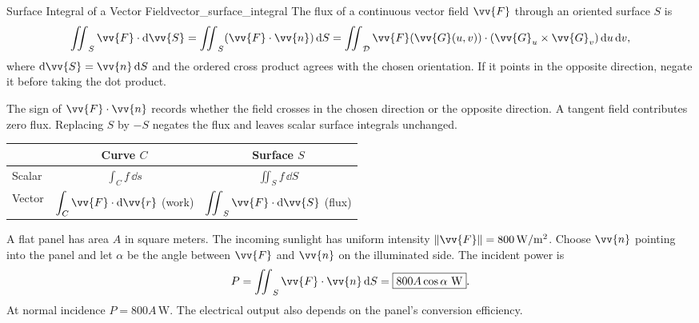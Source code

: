 \begin{theorem}{Surface Integral of a Vector Field}{vector_surface_integral}
The flux of a continuous vector field $\vv{F}$ through an oriented surface $S$ is
\[
    \iint_S \vv{F}\cdot\dd{\vv{S}}
    = \iint_S (\vv{F}\cdot\vv{n})\,\dd{S}
    = \iint_{\mathcal{D}}
      \vv{F}(\vv{G}(u,v))\cdot(\vv{G}_u \times \vv{G}_v)\,\dd{u}\,\dd{v},
\]
where $\dd{\vv{S}} = \vv{n}\,\dd{S}$ and the ordered cross product agrees with the chosen orientation. If it points in the opposite direction, negate it before taking the dot product.
\end{theorem}

The sign of $\vv{F}\cdot\vv{n}$ records whether the field crosses in the chosen direction or the opposite direction. A tangent field contributes zero flux. Replacing $S$ by $-S$ negates the flux and leaves scalar surface integrals unchanged.

\begin{center}
\renewcommand{\arraystretch}{1.55}
\begin{tabular}{lcc}
    & Curve $C$ & Surface $S$\\
    \hline
    Scalar & $\displaystyle\int_C f\,\dd{s}$ & $\displaystyle\iint_S f\,\dd{S}$\\
    Vector & $\displaystyle\int_C\vv{F}\cdot\dd{\vv{r}}$ (work)
           & $\displaystyle\iint_S\vv{F}\cdot\dd{\vv{S}}$ (flux)
\end{tabular}
\end{center}

\begin{example}
\begin{minipage}[c]{0.67\linewidth}
A flat panel has area $A$ in square meters. The incoming sunlight has uniform intensity $\lVert\vv{F}\rVert = 800\,\mathrm{W}/\mathrm{m}^2$. Choose $\vv{n}$ pointing into the panel and let $\alpha$ be the angle between $\vv{F}$ and $\vv{n}$ on the illuminated side. The incident power is
\[
    P = \iint_S \vv{F}\cdot\vv{n}\,\dd{S} = \boxed{800A\cos\alpha\ \mathrm{W}}.
\]
At normal incidence $P = 800A\,\mathrm{W}$. The electrical output also depends on the panel's conversion efficiency.
\end{minipage}\hfill
\begin{minipage}[c]{0.29\linewidth}
\centering
{}
\end{minipage}
\end{example}


